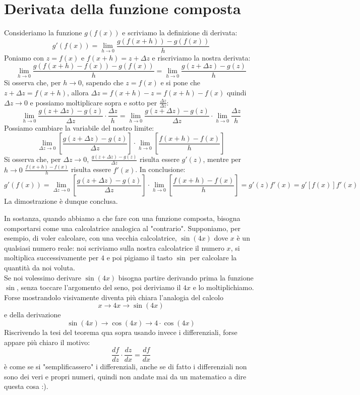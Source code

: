 \documentclass{report}
\begin{document}
\section{Derivata della funzione composta}
\par\noindent\smallskip 
\begin{myproof}
Consideriamo la funzione $g(f(x))$ e scriviamo la definizione di derivata:
$$
g'(f(x)) = \lim_{h \to 0} \frac{g(f(x+h))-g(f(x))}{h}
$$
Poniamo con $z=f(x)$ e $f(x+h)=z+\Delta z$ e riscriviamo la nostra derivata:
$$
\lim_{h \to 0} \frac{g(f(x+h)-f(x))-g(f(x))}{h} = \lim_{h \to 0} \frac{g(z+\Delta z)-g(z)}{h}
$$
Si osserva che, per $h \to 0$, sapendo che $z=f(x)$ e si pone che $z+\Delta z=f(x+h)$, allora $\Delta z = f(x+h)-z = f(x+h)-f(x)$ quindi $\Delta z \to 0$ e possiamo moltiplicare sopra e sotto per $\frac{\Delta z}{\Delta z}$:
$$
\lim_{h \to 0} \frac{g(z + \Delta z) - g(z)}{\Delta z} \cdot \frac{\Delta z}{h} = \lim_{h \to 0} \frac{g(z+\Delta z)-g(z)}{\Delta z} \cdot \lim_{h \to 0} \frac{\Delta z}{h}
$$
Possiamo cambiare la variabile del nostro limite:
$$
\lim_{\Delta z \to 0} \left[\frac{g(z+\Delta z) - g(z)}{\Delta z} \right] \cdot \lim_{h \to 0} \left[\frac{f(x+h)-f(x)}{h}\right]
$$
Si osserva che, per $\Delta z \to 0$, $\frac{g(z+\Delta z) - g(z)}{\Delta z}$ risulta essere $g'(z)$, mentre per $h \to 0$ $\frac{f(x+h)-f(x)}{h}$ risulta essere $f'(x)$. In conclusione:
$$
g'(f(x)) = \lim_{\Delta z \to 0} \left[\frac{g(z+\Delta z) - g(z)}{\Delta z} \right] \cdot \lim_{h \to 0} \left[\frac{f(x+h)-f(x)}{h}\right] = g'(z)f'(x) = g'\left[f(x)\right]f'(x)
$$
La dimostrazione è dunque conclusa.
\end{myproof}
\par\smallskip\noindent In sostanza, quando abbiamo a che fare con una funzione composta, bisogna comportarsi come una calcolatrice analogica al "contrario". Supponiamo, per esempio, di voler calcolare, con una vecchia calcolatrice, $\sin(4x)$ dove $x$ è un qualsiasi numero reale: noi scriviamo sulla nostra calcolatrice il numero $x$, si moltiplica successivamente per $4$ e poi pigiamo il tasto $\sin$ per calcolare la quantità da noi voluta. \\
Se noi volessimo derivare $\sin(4x)$ bisogna partire derivando prima la funzione $\sin$, senza toccare l'argomento del seno, poi deriviamo il $4x$ e lo moltiplichiamo.
Forse mostrandolo visivamente diventa più chiara l'analogia del calcolo
$$
	x \to 4x \to \sin(4x)
$$
e della derivazione
$$
	\sin(4x) \to \cos(4x) \to 4\cdot \cos(4x)
$$
Riscrivendo la tesi del teorema qua sopra usando invece i differenziali, forse appare più chiaro il motivo:
$$
\frac{df}{dz}\cdot\frac{dz}{dx} = \frac{df}{dx}
$$
è come se si "semplificassero" i differenziali, anche se di fatto i differenziali non sono dei veri e propri numeri, quindi non andate mai da un matematico a dire questa cosa :).
\end{document}
